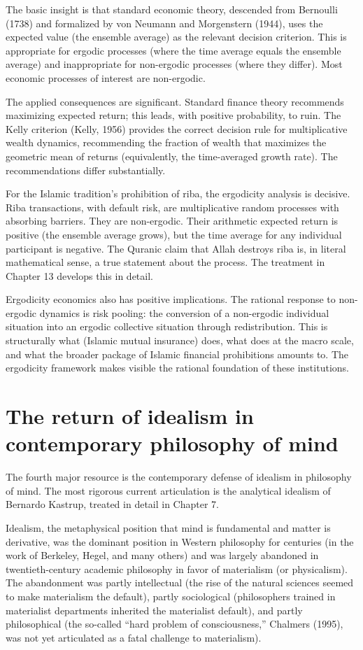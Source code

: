 The basic insight is that standard economic theory, descended from
Bernoulli (1738) and formalized by von Neumann and Morgenstern
(1944), uses the expected value (the ensemble average) as the
relevant decision criterion. This is appropriate for ergodic
processes (where the time average equals the ensemble average) and
inappropriate for non-ergodic processes (where they differ). Most
economic processes of interest are non-ergodic.

The applied consequences are significant. Standard finance theory
recommends maximizing expected return; this leads, with positive
probability, to ruin. The Kelly criterion (Kelly, 1956) provides the
correct decision rule for multiplicative wealth dynamics, recommending
the fraction of wealth that maximizes the geometric mean of returns
(equivalently, the time-averaged growth rate). The recommendations
differ substantially.

For the Islamic tradition's prohibition of riba, the ergodicity
analysis is decisive. Riba transactions, with default risk, are
multiplicative random processes with absorbing barriers. They are
non-ergodic. Their arithmetic expected return is positive (the
ensemble average grows), but the time average for any individual
participant is negative. The Quranic claim that Allah destroys riba
is, in literal mathematical sense, a true statement about the
process. The treatment in Chapter 13 develops this in detail.

Ergodicity economics also has positive implications. The rational
response to non-ergodic dynamics is risk pooling: the conversion of
a non-ergodic individual situation into an ergodic collective
situation through redistribution. This is structurally what
 (Islamic mutual insurance) does, what 
does at the macro scale, and what the broader package of Islamic
financial prohibitions amounts to. The ergodicity framework makes
visible the rational foundation of these institutions.

\section{The return of idealism in contemporary philosophy of mind}
\label{sec:idealism-return}

The fourth major resource is the contemporary defense of idealism
in philosophy of mind. The most rigorous current articulation is
the analytical idealism of Bernardo Kastrup, treated in detail in
Chapter 7.

Idealism, the metaphysical position that mind is fundamental and
matter is derivative, was the dominant position in Western
philosophy for centuries (in the work of Berkeley, Hegel, and many
others) and was largely abandoned in twentieth-century academic
philosophy in favor of materialism (or physicalism). The abandonment
was partly intellectual (the rise of the natural sciences seemed to
make materialism the default), partly sociological (philosophers
trained in materialist departments inherited the materialist
default), and partly philosophical (the so-called ``hard problem of
consciousness,'' Chalmers (1995), was not yet articulated as a
fatal challenge to materialism).

